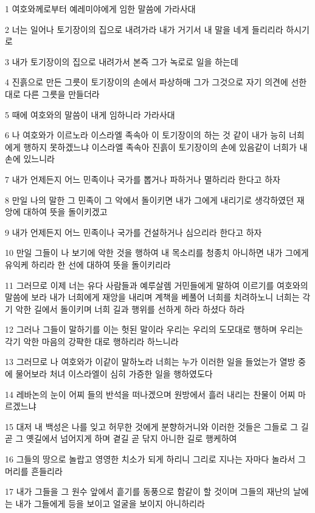 \par 1 여호와께로부터 예레미야에게 임한 말씀에 가라사대
\par 2 너는 일어나 토기장이의 집으로 내려가라 내가 거기서 내 말을 네게 들리리라 하시기로
\par 3 내가 토기장이의 집으로 내려가서 본즉 그가 녹로로 일을 하는데
\par 4 진흙으로 만든 그릇이 토기장이의 손에서 파상하매 그가 그것으로 자기 의견에 선한대로 다른 그릇을 만들더라
\par 5 때에 여호와의 말씀이 내게 임하니라 가라사대
\par 6 나 여호와가 이르노라 이스라엘 족속아 이 토기장이의 하는 것 같이 내가 능히 너희에게 행하지 못하겠느냐 이스라엘 족속아 진흙이 토기장이의 손에 있음같이 너희가 내 손에 있느니라
\par 7 내가 언제든지 어느 민족이나 국가를 뽑거나 파하거나 멸하리라 한다고 하자
\par 8 만일 나의 말한 그 민족이 그 악에서 돌이키면 내가 그에게 내리기로 생각하였던 재앙에 대하여 뜻을 돌이키겠고
\par 9 내가 언제든지 어느 민족이나 국가를 건설하거나 심으리라 한다고 하자
\par 10 만일 그들이 나 보기에 악한 것을 행하여 내 목소리를 청종치 아니하면 내가 그에게 유익케 하리라 한 선에 대하여 뜻을 돌이키리라
\par 11 그러므로 이제 너는 유다 사람들과 예루살렘 거민들에게 말하여 이르기를 여호와의 말씀에 보라 내가 너희에게 재앙을 내리며 계책을 베풀어 너희를 치려하노니 너희는 각기 악한 길에서 돌이키며 너희 길과 행위를 선하게 하라 하셨다 하라
\par 12 그러나 그들이 말하기를 이는 헛된 말이라 우리는 우리의 도모대로 행하며 우리는 각기 악한 마음의 강퍅한 대로 행하리라 하느니라
\par 13 그러므로 나 여호와가 이같이 말하노라 너희는 누가 이러한 일을 들었는가 열방 중에 물어보라 처녀 이스라엘이 심히 가증한 일을 행하였도다
\par 14 레바논의 눈이 어찌 들의 반석을 떠나겠으며 원방에서 흘러 내리는 찬물이 어찌 마르겠느냐
\par 15 대저 내 백성은 나를 잊고 허무한 것에게 분향하거니와 이러한 것들은 그들로 그 길 곧 그 옛길에서 넘어지게 하며 곁길 곧 닦지 아니한 길로 행케하여
\par 16 그들의 땅으로 놀랍고 영영한 치소가 되게 하리니 그리로 지나는 자마다 놀라서 그 머리를 흔들리라
\par 17 내가 그들을 그 원수 앞에서 흩기를 동풍으로 함같이 할 것이며 그들의 재난의 날에는 내가 그들에게 등을 보이고 얼굴을 보이지 아니하리라
